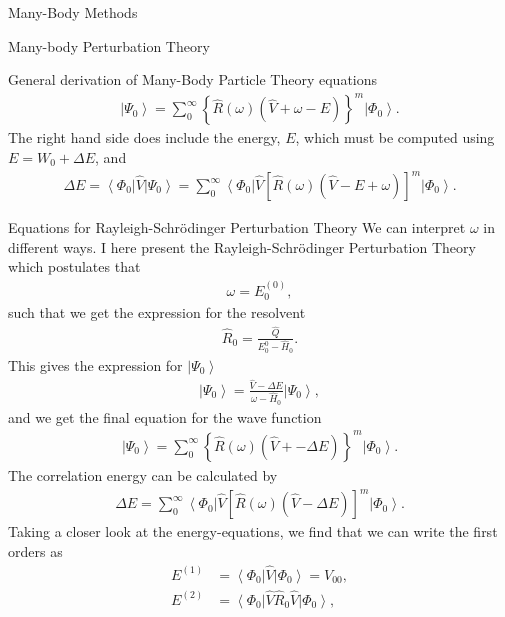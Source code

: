 \documentclass[twoside,english]{uiofysmaster}
\begin{document}
\begin{chapter}{Many-Body Methods}
\begin{section}{Many-body Perturbation Theory}
\begin{subsection}{General derivation of Many-Body Particle Theory equations}
	 		\begin{align}
	 			\left| \Psi_0 \right> = \sum_0^\infty \left\{ \hat R(\omega) (\hat V + \omega - E) \right\}^m \left| \Phi_0 \right>.
	 		\end{align}
	 		The right hand side does include the energy, $E$, which must be computed using $ E = W_0 + \Delta E$, and
	 		\begin{align}
	 			\Delta E = \left< \Phi_0 \right| \hat V \left| \Psi_0 \right> 
	 			= \sum_0^\infty \left< \Phi_0 \right| \hat V \left[ \hat R(\omega) (\hat V - E + \omega) \right]^m \left| \Phi_0 \right>.
	 		\end{align}
	 	\end{subsection}

	 	\begin{subsection}{Equations for Rayleigh-Schr\"{o}dinger Perturbation Theory}
	 		We can interpret $\omega$ in different ways. I here present the Rayleigh-Schr\"{o}dinger Perturbation Theory which postulates that
	 		\begin{align}
	 			\omega = E_0^{(0)},
	 		\end{align}
	 		such that we get the expression for the resolvent
	 		\begin{align}
	 			\hat R_0 = \frac{\hat Q}{E_0^{0} - \hat H_0}.
	 		\end{align}
	 		This gives the expression for $\left| \Psi_0 \right>$
	 		\begin{align}
	 			\left| \Psi_0 \right> = \frac{ \hat V - \Delta E }{\omega - \hat H_0} \left| \Psi_0 \right>,
	 		\end{align}
	 		and we get the final equation for the wave function 
	 		\begin{align}
	 			\left| \Psi_0 \right> = \sum_0^\infty \left\{ \hat R(\omega) (\hat V + - \Delta E) \right\}^m \left| \Phi_0 \right>.
	 		\end{align}
	 		The correlation energy can be calculated by 
	 		\begin{align}
	 			\Delta E = \sum_0^\infty \left< \Phi_0 \right| \hat V \left[ \hat R(\omega) (\hat V - \Delta E) \right]^m \left| \Phi_0 \right> .
	 		\end{align}
	 		Taking a closer look at the energy-equations, we find that we can write the first orders as
	 		\begin{align*}
	 			E^{(1)} &= \left< \Phi_0 \right| \hat V \left| \Phi_0 \right>  = V_{00},\\
	 			E^{(2)} &= \left< \Phi_0 \right| \hat V \hat R_0 \hat V \left| \Phi_0 \right>, \\

\end{align*}
\end{subsection}
\end{section}
\end{chapter}
\end{document}

